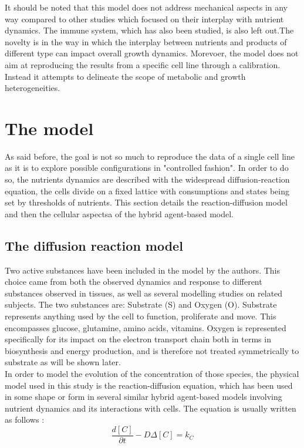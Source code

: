 \documentclass[11pt,a4paper]{article}
\begin{document}
It should be noted that this model does not address mechanical aspects in any way compared to other studies which focused on their interplay with nutrient dynamics.\cite{Milotti2010}\cite{Bull2020} The immune system, which has also been studied, is also left out.\cite{Ghaffarizadeh2017}The novelty is in the way in which the interplay between nutrients and products of different type can impact overall growth dynamics. Morevoer, the model does not aim at reproducing the results from a specific cell line through a calibration. Instead it attempts to delineate the scope of metabolic and growth heterogeneities.\\


\newpage
\section{The model}
As said before, the goal is not so much to reproduce the data of a single cell line as it is to explore possible configurations in "controlled fashion". In order to do so, the nutrients dynamics are described with the widespread diffusion-reaction equation, the cells divide on a fixed lattice with consumptions and states being set by thresholds of nutrients. This section details the reaction-diffusion model and then the cellular aspectsa of the hybrid agent-based model.\\

\subsection{The diffusion reaction model}
Two active substances have been included in the model by the authors. This choice came from both the observed dynamics and response to different substances observed in tissues, as well as several modelling studies on related subjects.\cite{Kempf2005}\cite{Bull2020}\cite{Mao2018}\cite{Jagiella2016} The two substances are: Substrate (S) and  Oxygen (O). Substrate represents anything used by the cell to function, proliferate and move. This encompasses glucose, glutamine, amino acids, vitamins. Oxygen is represented specifically for its impact on the electron transport chain both in terms in biosynthesis and energy production, and is therefore not treated symmetrically to substrate as will be shown later.\\

In order to model the evolution of the concentration of those species, the physical model used in this study is the reaction-diffusion equation, which has been used in some shape or form in several similar hybrid agent-based models involving nutrient dynamics and its interactions with cells.\cite{Bull2020}\cite{Kempf2005}\cite{Mao2018}\cite{Cleri2019}\cite{Kempf2015}
The equation is usually written as follows : 
\[ \frac{d [C]}{\partial t}  -  D \Delta [C] = k_C  \]
\end{document}
